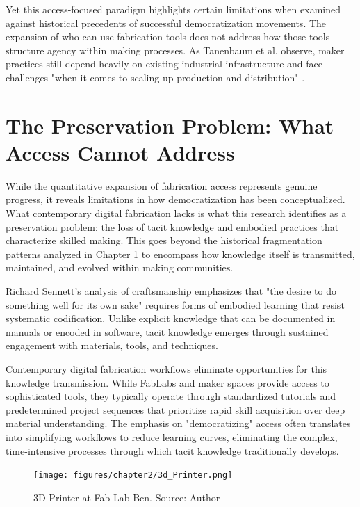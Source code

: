 Yet this access-focused paradigm highlights certain limitations when examined against historical precedents of successful democratization movements. The expansion of who can use fabrication tools does not address how those tools structure agency within making processes. As Tanenbaum et al. observe, maker practices still depend heavily on existing industrial infrastructure and face challenges "when it comes to scaling up production and distribution" \citep{tanenbaum2013}.

\section{The Preservation Problem: What Access Cannot Address}

While the quantitative expansion of fabrication access represents genuine progress, it reveals limitations in how democratization has been conceptualized. What contemporary digital fabrication lacks is what this research identifies as a preservation problem: the loss of tacit knowledge and embodied practices that characterize skilled making. This goes beyond the historical fragmentation patterns analyzed in Chapter 1 to encompass how knowledge itself is transmitted, maintained, and evolved within making communities.

\vspace{0.5cm}

Richard Sennett's analysis of craftsmanship emphasizes that "the desire to do something well for its own sake" \citep{sennet2009} requires forms of embodied learning that resist systematic codification. Unlike explicit knowledge that can be documented in manuals or encoded in software, tacit knowledge emerges through sustained engagement with materials, tools, and techniques.

\vspace{0.5cm}

Contemporary digital fabrication workflows eliminate opportunities for this knowledge transmission. While FabLabs and maker spaces provide access to sophisticated tools, they typically operate through standardized tutorials and predetermined project sequences that prioritize rapid skill acquisition over deep material understanding. The emphasis on "democratizing" access often translates into simplifying workflows to reduce learning curves, eliminating the complex, time-intensive processes through which tacit knowledge traditionally develops.

\begin{figure}[H]
\centering
\texttt{[image: figures/chapter2/3d\_Printer.png]}
\caption{3D Printer at Fab Lab Bcn. Source: Author}
\label{fig:3d_printer}
\end{figure}

